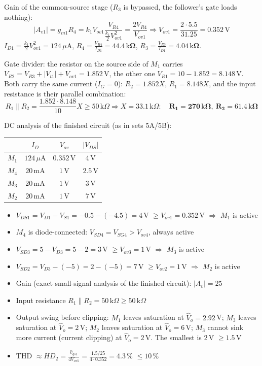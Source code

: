 \documentclass[11pt]{article}
\newcommand{\solstep}[2]{\par\medskip{\color{stepc}\textbf{Step #1 --- #2}}\par\nopagebreak}
\begin{document}
Gain of the common-source stage ($R_3$ is bypassed, the follower's gate loads nothing): \[|A_{v1}| = g_{m1}R_4 = k_1V_{ov1}\frac{V_{R4}}{\frac{k_1}{2}V_{ov1}^2} = \frac{2V_{R4}}{V_{ov1}} \Rightarrow V_{ov1} = \frac{2\cdot5.5}{31.25} = 0.352\,\mathrm{V}\]$I_{D1} = \frac{k_1}{2}V_{ov1}^2 = 124\,\mu \mathrm{A}$, $R_4 = \frac{V_{R4}}{I_{D1}} = \mathbf{44.4\,\mathrm{k}\Omega}$, $R_3 = \frac{V_{R3}}{I_{D1}} = \mathbf{4.04\,\mathrm{k}\Omega}$.

Gate divider: the resistor on the source side of $M_1$ carries $V_{R2} = V_{R3} + |V_{t1}| + V_{ov1} = 1.852$\,V, the other one $V_{R1} = 10 - 1.852 = 8.148$\,V. Both carry the same current ($I_G = 0$): $R_{2} = 1.852X$, $R_{1} = 8.148X$, and the input resistance is their parallel combination: \[R_1\|R_2 = \frac{1.852\cdot8.148}{10}X \ge 50\,\mathrm{k}\Omega \Rightarrow X = 33.1\,\mathrm{k}\Omega:\quad \mathbf{R_1 = 270\,\mathrm{k}\Omega},\ \mathbf{R_2 = 61.4\,\mathrm{k}\Omega}\]
\solstep{4}{Check by analysis}DC analysis of the finished circuit (as in sets 5A/5B):\begin{center}\renewcommand{\arraystretch}{1.35}
\begin{tabular}{cccc}
\toprule
 & $I_D$ & $V_{ov}$ & $|V_{DS}|$ \\
\midrule
$M_{1}$ & $124\,\mu \mathrm{A}$ & $0.352$\,V & $4$\,V \\
$M_{4}$ & $20\,\mathrm{m}\mathrm{A}$ & $1$\,V & $2.5$\,V \\
$M_{3}$ & $20\,\mathrm{m}\mathrm{A}$ & $1$\,V & $3$\,V \\
$M_{2}$ & $20\,\mathrm{m}\mathrm{A}$ & $1$\,V & $7$\,V \\
\bottomrule
\end{tabular}\end{center}
\begin{itemize}[leftmargin=*,itemsep=2pt]
\item $V_{DS1} = V_{D1} - V_{S1} = -0.5 - (-4.5) = 4\,\mathrm{V}$ $\ge V_{ov1} = 0.352$\,V $\Rightarrow$ $M_{1}$ is active \checkmark
\item $M_{4}$ is diode-connected: $V_{SD4} = V_{SG4} > V_{ov4}$, always active \checkmark
\item $V_{SD3} = 5 - V_{D3} = 5 - 2 = 3\,\mathrm{V}$ $\ge V_{ov3} = 1$\,V $\Rightarrow$ $M_{3}$ is active \checkmark
\item $V_{SD2} = V_{D3} - (-5) = 2 - (-5) = 7\,\mathrm{V}$ $\ge V_{ov2} = 1$\,V $\Rightarrow$ $M_{2}$ is active \checkmark
\item Gain (exact small-signal analysis of the finished circuit): $|A_v| = 25$ \checkmark
\item Input resistance $R_1\|R_2 = 50\,\mathrm{k}\Omega \ge 50\,\mathrm{k}\Omega$ \checkmark
\item Output swing before clipping: $M_1$ leaves saturation at $\hat V_o = 2.92$\,V; $M_3$ leaves saturation at $\hat V_o = 2$\,V; $M_2$ leaves saturation at $\hat V_o = 6$\,V; $M_3$ cannot sink more current (current clipping) at $\hat V_o = 2$\,V. The smallest is $2$\,V $\ge 1.5$\,V \checkmark
\item THD $\approx HD_2 = \frac{\hat v_{gs1}}{4V_{ov1}} = \frac{1.5/25}{4\cdot0.352} = 4.3\,\%$ $\le 10\,\%$ \checkmark
\end{itemize}
\end{document}
